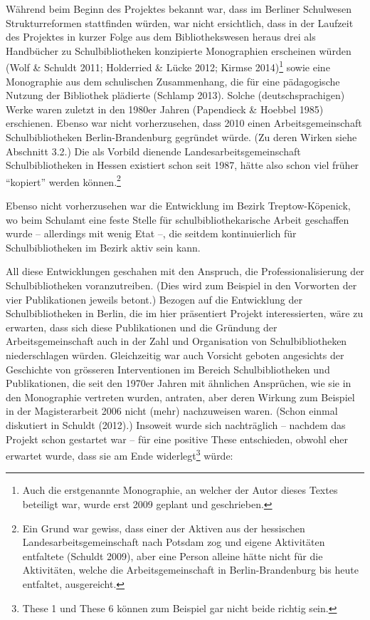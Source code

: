 \documentclass[a4paper,
fontsize=11pt,
oneside,
numbers=noperiodatend,
parskip=half-,
bibliography=totoc,
final
]{scrartcl}
\begin{document}
Während beim Beginn des Projektes bekannt war, dass im Berliner
Schulwesen Strukturreformen stattfinden würden, war nicht ersichtlich,
dass in der Laufzeit des Projektes in kurzer Folge aus dem
Bibliothekswesen heraus drei als Handbücher zu Schulbibliotheken
konzipierte Monographien erscheinen würden (Wolf \& Schuldt 2011;
Holderried \& Lücke 2012; Kirmse 2014)\footnote{Auch die erstgenannte
  Monographie, an welcher der Autor dieses Textes beteiligt war, wurde
  erst 2009 geplant und geschrieben.} sowie eine Monographie aus dem
schulischen Zusammenhang, die für eine pädagogische Nutzung der
Bibliothek plädierte (Schlamp 2013). Solche (deutschsprachigen) Werke
waren zuletzt in den 1980er Jahren (Papendieck \& Hoebbel 1985)
erschienen. Ebenso war nicht vorherzusehen, dass 2010 einen
Arbeitsgemeinschaft Schulbibliotheken Berlin-Brandenburg gegründet
würde. (Zu deren Wirken siehe Abschnitt 3.2.) Die als Vorbild dienende
Landesarbeitsgemeinschaft Schulbibliotheken in Hessen existiert schon
seit 1987, hätte also schon viel früher \enquote{kopiert} werden
können.\footnote{Ein Grund war gewiss, dass einer der Aktiven aus der
  hessischen Landesarbeitsgemeinschaft nach Potsdam zog und eigene
  Aktivitäten entfaltete (Schuldt 2009), aber eine Person alleine hätte
  nicht für die Aktivitäten, welche die Arbeitsgemeinschaft in
  Berlin-Brandenburg bis heute entfaltet, ausgereicht.}

Ebenso nicht vorherzusehen war die Entwicklung im Bezirk
Treptow-Köpenick, wo beim Schulamt eine feste Stelle für
schulbibliothekarische Arbeit geschaffen wurde -- allerdings mit wenig
Etat --, die seitdem kontinuierlich für Schulbibliotheken im Bezirk
aktiv sein kann.

All diese Entwicklungen geschahen mit den Anspruch, die
Professionalisierung der Schulbibliotheken voranzutreiben. (Dies wird
zum Beispiel in den Vorworten der vier Publikationen jeweils betont.)
Bezogen auf die Entwicklung der Schulbibliotheken in Berlin, die im hier
präsentiert Projekt interessierten, wäre zu erwarten, dass sich diese
Publikationen und die Gründung der Arbeitsgemeinschaft auch in der Zahl
und Organisation von Schulbibliotheken niederschlagen würden.
Gleichzeitig war auch Vorsicht geboten angesichts der Geschichte von
grösseren Interventionen im Bereich Schulbibliotheken und Publikationen,
die seit den 1970er Jahren mit ähnlichen Ansprüchen, wie sie in den
Monographie vertreten wurden, antraten, aber deren Wirkung zum Beispiel
in der Magisterarbeit 2006 nicht (mehr) nachzuweisen waren. (Schon
einmal diskutiert in Schuldt (2012).) Insoweit wurde sich nachträglich
-- nachdem das Projekt schon gestartet war -- für eine positive These
entschieden, obwohl eher erwartet wurde, dass sie am Ende
widerlegt\footnote{These 1 und These 6 können zum Beispiel gar nicht
  beide richtig sein.} würde:
\end{document}
